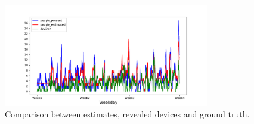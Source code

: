 \begin{figure}[h]
\centering 
\includegraphics[width=0.8\textwidth]{images/comparison} 
\caption{Comparison between estimates, revealed devices and ground truth.}
\label{fig:comparison}
\end{figure}




